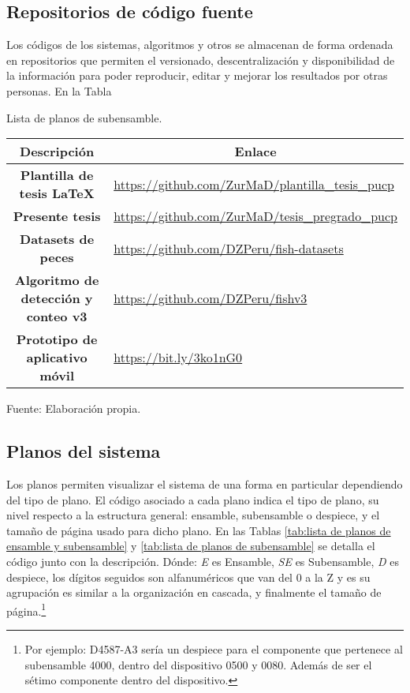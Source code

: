 \subsection{Repositorios de código fuente}

Los códigos de los sistemas, algoritmos y otros se almacenan de forma ordenada en repositorios que permiten el versionado, descentralización y disponibilidad de la información para poder reproducir, editar y mejorar los resultados por otras personas. En la Tabla

\begin{mytable}[H]
	\footnotesize\centering
	\caption{Lista de planos de subensamble.}
	\label{tab:lista de repositorios}
	\begin{tabular}{|c|l|}
		\hline
		\multicolumn{1}{|c|}{\textbf{Descripción}} & \multicolumn{1}{c|}{\textbf{Enlace}} \\ \hline
		\textbf{Plantilla de tesis \LaTeX} & \href{https://github.com/ZurMaD/plantilla_tesis_pucp}{https://github.com/ZurMaD/plantilla\_tesis\_pucp}  \\ \hline
		\textbf{Presente tesis} & \href{https://github.com/ZurMaD/tesis_pregrado_pucp}{https://github.com/ZurMaD/tesis\_pregrado\_pucp}  \\ \hline
		\textbf{Datasets de peces} & \href{https://github.com/DZPeru/fish-datasets}{https://github.com/DZPeru/fish-datasets}  \\ \hline
		\textbf{Algoritmo de detección y conteo v3} & \href{https://github.com/DZPeru/fishv3}{https://github.com/DZPeru/fishv3}  \\ \hline	
		\textbf{Prototipo de aplicativo móvil} & \href{https://bit.ly/3ko1nG0}{https://bit.ly/3ko1nG0}  \\ \hline				
	\end{tabular}
	\begin{myflushcenteraftertable}	
		Fuente: Elaboración propia.
	\end{myflushcenteraftertable}
\end{mytable}

\subsection{Planos del sistema}
\label{ssec:planos del sistema}

Los planos permiten visualizar el sistema de una forma en particular dependiendo del tipo de plano. El código asociado a cada plano indica el tipo de plano, su nivel respecto a la estructura general: ensamble, subensamble o despiece, y el tamaño de página usado para dicho plano. En las Tablas \ref{tab:lista de planos de ensamble y subensamble} y \ref{tab:lista de planos de subensamble} se detalla el código junto con la descripción. Dónde: \textit{E} es Ensamble, \textit{SE} es Subensamble, \textit{D} es despiece, los dígitos seguidos son alfanuméricos que van del 0 a la Z y es su agrupación es similar a la organización en cascada, y finalmente el tamaño de página.\footnote{Por ejemplo: D4587-A3 sería un despiece para el componente que pertenece al subensamble 4000, dentro del dispositivo 0500 y 0080. Además de ser el sétimo componente dentro del dispositivo.}

